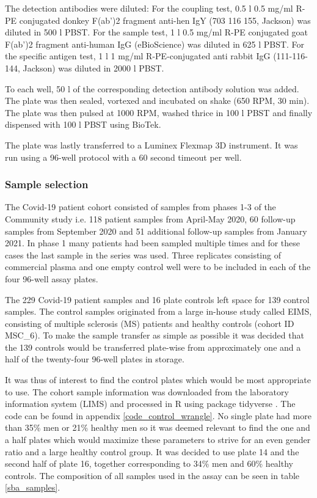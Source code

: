 \documentclass{article}
\begin{document}
The detection antibodies were diluted: For the coupling test, 0.5 \textmu l 0.5 mg/ml R-PE conjugated donkey F(ab')2 fragment anti-hen IgY (703 116 155, Jackson) was diluted in 500 \textmu l PBST. For the sample test, 1 \textmu l 0.5 mg/ml R-PE conjugated goat F(ab')2 fragment anti-human IgG (eBioScience) was diluted in 625 \textmu l PBST. For the specific antigen test, 1 \textmu l 1 mg/ml R-PE-conjugated anti rabbit IgG (111-116-144, Jackson) was diluted in 2000 \textmu l PBST.

To each well, 50 \textmu l of the corresponding detection antibody solution was added. The plate was then sealed, vortexed and incubated on shake (650 RPM, 30 min). The plate was then pulsed at 1000 RPM, washed thrice in 100 \textmu l PBST and finally dispensed with 100 \textmu l PBST using BioTek.

The plate was lastly transferred to a Luminex Flexmap 3D instrument. It was run using a 96-well protocol with a 60 second timeout per well.

\subsubsection{Sample selection}\label{sba_sample_selection}
The Covid-19 patient cohort consisted of samples from phases 1-3 of the Community study \cite{fas2} i.e. 118 patient samples from April-May 2020, 60 follow-up samples from September 2020 and 51 additional follow-up samples from January 2021. In phase 1 many patients had been sampled multiple times and for these cases the last sample in the series was used. Three replicates consisting of commercial plasma and one empty control well were to be included in each of the four 96-well assay plates.

The 229 Covid-19 patient samples and 16 plate controls left space for 139 control samples. The control samples originated from a large in-house study called EIMS, consisting of multiple sclerosis (MS) patients and healthy controls (cohort ID MSC\_6). To make the sample transfer as simple as possible it was decided that the 139 controls would be transferred plate-wise from approximately one and a half of the twenty-four 96-well plates in storage.

It was thus of interest to find the control plates which would be most appropriate to use. The cohort sample information was downloaded from the laboratory information system (LIMS) and processed in R \cite{R} using package tidyverse \cite{tidyverse}. The code can be found in appendix \ref{code_control_wrangle}. No single plate had more than 35\% men or 21\% healthy men so it was deemed relevant to find the one and a half plates which would maximize these parameters to strive for an even gender ratio and a large healthy control group. It was decided to use plate 14 and the second half of plate 16, together corresponding to 34\% men and 60\% healthy controls. The composition of all samples used in the assay can be seen in table \ref{sba_samples}.
\end{document}
